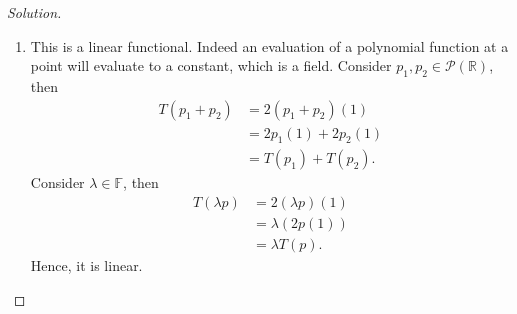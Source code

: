 \documentclass{article}
\begin{document}
\begin{proof}[Solution]
\begin{enumerate}[label=(\alph*)]
        \newpage
        \item
        This is a linear functional. Indeed an evaluation of a polynomial function at a point will 
        evaluate to a constant, which is a field. Consider $p_1, p_2\in\mathcal{P}(\mathbb{R})$, 
        then
        \begin{align*}
            T(p_1+p_2) & = 2(p_1+p_2)(1) \\
            & = 2p_1(1) + 2p_2(1) \\
            & = T(p_1) + T(p_2).
        \end{align*}
        Consider $\lambda\in\mathbb{F}$, then
        \begin{align*}
            T(\lambda p) & = 2(\lambda p)(1) \\
            & = \lambda (2p(1)) \\
            & = \lambda T(p).
        \end{align*}
        Hence, it is linear.
    \end{enumerate}
\end{proof}

\newpage
\end{document}

